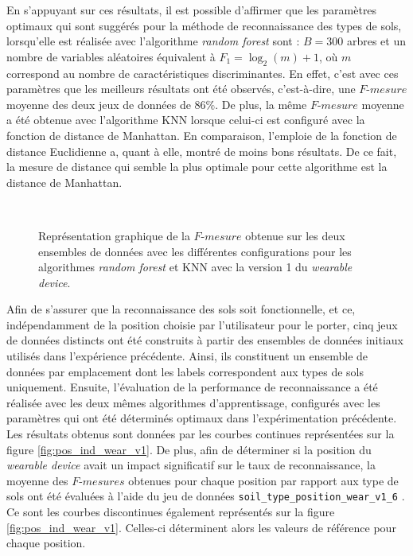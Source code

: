 En s'appuyant sur ces résultats, il est possible d'affirmer que les paramètres optimaux qui sont suggérés pour la méthode de reconnaissance des types de sols, lorsqu'elle est réalisée avec l'algorithme \textit{random forest} sont : $B=300$ arbres et un nombre de variables aléatoires équivalent à $F_1=\log_2(m) + 1$, où $m$ correspond au nombre de caractéristiques discriminantes. En effet, c'est avec ces paramètres que les meilleurs résultats ont été observés, c'est-à-dire, une $F\mbox{-}mesure$ moyenne des deux jeux de données de $86\%$. De plus, la même $F\mbox{-}mesure$ moyenne a été obtenue avec l'algorithme \acs{KNN} lorsque celui-ci est configuré avec la fonction de distance de Manhattan. En comparaison, l'emploie de la fonction de distance Euclidienne a, quant à elle, montré de moins bons résultats. De ce fait, la mesure de distance qui semble la plus optimale pour cette algorithme est la distance de Manhattan.

\begin{figure}[t!]
    \centering
    \\[20pt]
    \caption{Représentation graphique de la $F\mbox{-} mesure$ obtenue sur les deux ensembles de données avec les différentes configurations pour les algorithmes \textit{random forest} et \acs{KNN} avec la version 1 du \textit{wearable device}.}
    \label{fig:results_wear_v1}
\end{figure}

Afin de s'assurer que la reconnaissance des sols soit fonctionnelle, et ce, indépendamment de la position choisie par l'utilisateur pour le porter, cinq jeux de données distincts ont été construits à partir des ensembles de données initiaux utilisés dans l'expérience précédente. Ainsi, ils constituent un ensemble de données par emplacement dont les labels correspondent aux types de sols uniquement. Ensuite, l'évaluation de la performance de reconnaissance a été réalisée avec les deux mêmes algorithmes d'apprentissage, configurés avec les paramètres qui ont été déterminés optimaux dans l'expérimentation précédente. Les résultats obtenus sont données par les courbes continues représentées sur la figure \ref{fig:pos_ind_wear_v1}. De plus, afin de déterminer si la position du \textit{wearable device} avait un impact significatif sur le taux de reconnaissance, la moyenne des $F\mbox{-}mesures$ obtenues pour chaque position par rapport aux type de sols ont été évaluées à l'aide du jeu de données \og \texttt{soil\_type\_position\_wear\_v1\_6} \fg. Ce sont les courbes discontinues également représentés sur la figure \ref{fig:pos_ind_wear_v1}. Celles-ci déterminent alors les valeurs de référence pour chaque position.

